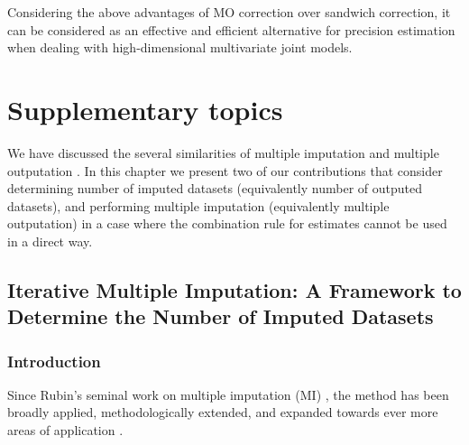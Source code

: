 \documentclass[11pt,a5paper,twoside]{book}
\begin{document}
Considering the above advantages of MO correction over sandwich correction, it can be considered as an effective and efficient alternative for precision estimation when dealing with high-dimensional multivariate joint models.













\chapter{Supplementary topics}

We have discussed the several similarities of multiple imputation \citep{rubin1987, carpenter2012} and multiple outputation \citep{hoffman2001, follmann2003}. In this chapter we present two of our contributions that consider determining number of imputed datasets (equivalently number of outputed datasets), and performing multiple imputation (equivalently multiple outputation) in a case where the combination rule for estimates cannot be used in a direct way.

\section[Iterative Multiple Imputation]{Iterative Multiple Imputation: A Framework to Determine the Number of Imputed Datasets}
\label{secc_IMI}



\subsection{Introduction}

Since Rubin's seminal work on multiple imputation (MI) \citep{rubin1978,rubin1979,rubin1987},
the method has been broadly applied, methodologically extended, and expanded towards ever more areas of application  \citep{carpenter2008,buuren12,carpenter2012,wim2015}.  {\color{black}{Multiple imputation is a commonly used approach to analyze incomplete data. A growing literature and increasing number of software implementations have contributed to the spread of the method. One of the attractions of MI is its very good to excellent performance even with a relatively small number of imputed datasets. This was important when Rubin created the method, about forty years ago, in view of, among others, the US Census. It still is today because of ever increasing data streams.}} 
\end{document}

